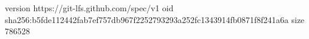 version https://git-lfs.github.com/spec/v1
oid sha256:b5fde112442fab7ef757db967f2252793293a252fc1343914fb0871f8f241a6a
size 786528
